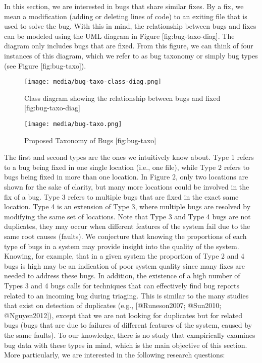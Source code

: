 In this section, we are interested in bugs that share similar fixes. By
a fix, we mean a modification (adding or deleting lines of code) to an
exiting file that is used to solve the bug. With this in mind, the
relationship between bugs and fixes can be modeled using the UML diagram
in Figure {[}fig:bug-taxo-diag{]}. The diagram only includes bugs that
are fixed. From this figure, we can think of four instances of this
diagram, which we refer to as bug taxonomy or simply bug types (see
Figure {[}fig:bug-taxo{]}).

\begin{figure}[htbp]
\centering
\texttt{[image: media/bug-taxo-class-diag.png]}
\caption{Class diagram showing the relationship between bugs and fixed
{[}fig:bug-taxo-diag{]}}
\end{figure}

\begin{figure}[htbp]
\centering
\texttt{[image: media/bug-taxo.png]}
\caption{Proposed Taxonomy of Bugs {[}fig:bug-taxo{]}}
\end{figure}

The first and second types are the ones we intuitively know about. Type
1 refers to a bug being fixed in one single location (i.e., one file),
while Type 2 refers to bugs being fixed in more than one location. In
Figure 2, only two locations are shown for the sake of clarity, but many
more locations could be involved in the fix of a bug. Type 3 refers to
multiple bugs that are fixed in the exact same location. Type 4 is an
extension of Type 3, where multiple bugs are resolved by modifying the
same set of locations. Note that Type 3 and Type 4 bugs are not
duplicates, they may occur when different features of the system fail
due to the same root causes (faults). We conjecture that knowing the
proportions of each type of bugs in a system may provide insight into
the quality of the system. Knowing, for example, that in a given system
the proportion of Type 2 and 4 bugs is high may be an indication of poor
system quality since many fixes are needed to address these bugs. In
addition, the existence of a high number of Types 3 and 4 bugs calls for
techniques that can effectively find bug reports related to an incoming
bug during triaging. This is similar to the many studies that exist on
detection of duplicates (e.g., {[}@Runeson2007; @Sun2010;
@Nguyen2012{]}), except that we are not looking for duplicates but for
related bugs (bugs that are due to failures of different features of the
system, caused by the same faults). To our knowledge, there is no study
that exmpirically examines bug data with these types in mind, which is
the main objective of this section. More particularly, we are interested
in the following research questions:

